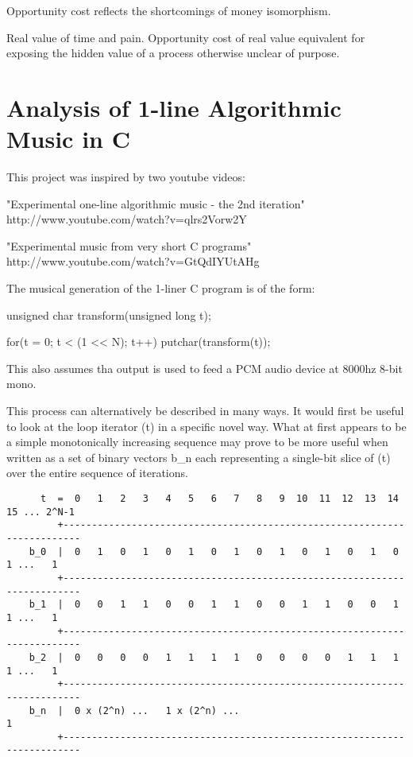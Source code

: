 \documentclass[11pt]{book}
\begin{document}
Opportunity cost reflects the shortcomings of money isomorphism.

Real value of time and pain. Opportunity cost of real value equivalent for exposing the hidden value of a process otherwise unclear of purpose.

\chapter{Analysis of 1-line Algorithmic Music in C}

This project was inspired by two youtube videos:

	"Experimental one-line algorithmic music - the 2nd iteration"
	http://www.youtube.com/watch?v=qlrs2Vorw2Y

	"Experimental music from very short C programs"
	http://www.youtube.com/watch?v=GtQdIYUtAHg

The musical generation of the 1-liner C program is of the form:

	unsigned char transform(unsigned long t);

	for(t = 0; t < (1 << N); t++) {
		putchar(transform(t));
	}

This also assumes tha output is used to feed a PCM audio device at 8000hz 8-bit mono.

This process can alternatively be described in many ways. It would first be useful to look at the loop iterator (t) in a specific
novel way.  What at first appears to be a simple monotonically increasing sequence may prove to be more useful when written as
a set of binary vectors b\_n each representing a single-bit slice of (t) over the entire sequence of iterations.

\begin{verbatim}
	  t  =  0   1   2   3   4   5   6   7   8   9  10  11  12  13  14  15 ... 2^N-1
	     +-------------------------------------------------------------------------
	b_0  |  0   1   0   1   0   1   0   1   0   1   0   1   0   1   0   1 ...   1
	     +-------------------------------------------------------------------------
	b_1  |  0   0   1   1   0   0   1   1   0   0   1   1   0   0   1   1 ...   1
	     +-------------------------------------------------------------------------
	b_2  |  0   0   0   0   1   1   1   1   0   0   0   0   1   1   1   1 ...   1
	     +-------------------------------------------------------------------------
	b_n  |  0 x (2^n) ...   1 x (2^n) ...                                       1
	     +-------------------------------------------------------------------------
\end{verbatim}
\end{document}
